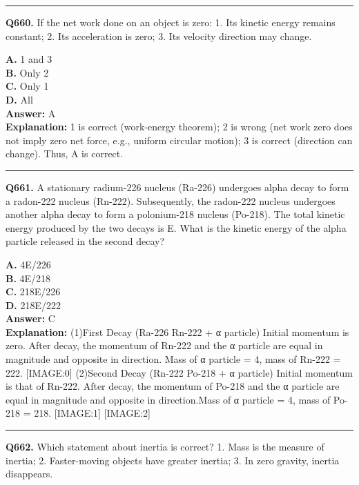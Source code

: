 \documentclass[12pt]{article}
\begin{document}
\hrule
\vspace{1em}


\noindent
\textbf{Q660.} If the net work done on an object is zero:
1.
Its kinetic energy remains constant;
2.
Its acceleration is zero;
3.
Its velocity direction may change.



\textbf{A.} 1 and 3 \\
\textbf{B.} Only 2 \\
\textbf{C.} Only 1 \\
\textbf{D.} All \\

\textbf{Answer:} A \\
\textbf{Explanation:} 1 is correct (work-energy theorem); 2 is wrong (net work zero does not imply zero net force, e.g., uniform circular motion); 3 is correct (direction can change). Thus, A is correct.

\hrule
\vspace{1em}


\noindent
\textbf{Q661.} A stationary radium-226 nucleus (Ra-226) undergoes alpha decay to form a radon-222 nucleus (Rn-222). Subsequently, the radon-222 nucleus undergoes another alpha decay to form a polonium-218 nucleus (Po-218). The total kinetic energy produced by the two decays is E. What is the kinetic energy of the alpha particle released in the second decay?



\textbf{A.} 4E​/226 \\
\textbf{B.} 4E​/218 \\
\textbf{C.} 218E​/226 \\
\textbf{D.} 218E​/222 \\

\textbf{Answer:} C \\
\textbf{Explanation:} (1)First Decay (Ra-226 \to  Rn-222 + α particle)
Initial momentum is zero. After decay, the momentum of Rn-222 and the α particle are equal in magnitude and opposite in direction. Mass of α particle = 4, mass of Rn-222 = 222.
[IMAGE:0]
(2)Second Decay (Rn-222 \to  Po-218 + α particle)
Initial momentum is that of Rn-222. After decay, the momentum of Po-218 and the α particle are equal in magnitude and opposite in direction.Mass of α particle = 4, mass of Po-218 = 218.
[IMAGE:1]
[IMAGE:2]

\hrule
\vspace{1em}


\noindent
\textbf{Q662.} Which statement about inertia is correct?
1.
Mass is the measure of inertia;
2.
Faster-moving objects have greater inertia;
3.
In zero gravity, inertia disappears.
\end{document}
